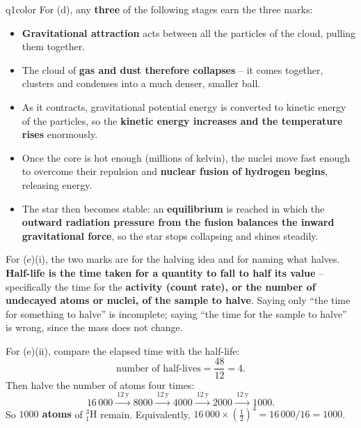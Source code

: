 \documentclass[11pt,a4paper]{article}
\begin{document}
\begin{ansbox}{q1color}
For (d), any \textbf{three} of the following stages earn the three marks:

\begin{itemize}[nosep,leftmargin=*]
\item \textbf{Gravitational attraction} acts between all the particles of the cloud, pulling them together.
\item The cloud of \textbf{gas and dust therefore collapses} -- it comes together, clusters and condenses into a much denser, smaller ball.
\item As it contracts, gravitational potential energy is converted to kinetic energy of the particles, so the \textbf{kinetic energy increases and the temperature rises} enormously.
\item Once the core is hot enough (millions of kelvin), the nuclei move fast enough to overcome their repulsion and \textbf{nuclear fusion of hydrogen begins}, releasing energy.
\item The star then becomes stable: an \textbf{equilibrium} is reached in which the \textbf{outward radiation pressure from the fusion balances the inward gravitational force}, so the star stops collapsing and shines steadily.
\end{itemize}

For (e)(i), the two marks are for the halving idea and for naming what halves. \textbf{Half-life is the time taken for a quantity to fall to half its value} -- specifically the time for the \textbf{activity (count rate), or the number of undecayed atoms or nuclei, of the sample to halve}. Saying only ``the time for something to halve'' is incomplete; saying ``the time for the sample to halve'' is wrong, since the mass does not change.

For (e)(ii), compare the elapsed time with the half-life:
\[ \text{number of half-lives} = \frac{48}{12} = 4. \]
Then halve the number of atoms four times:
\[ 16\,000 \xrightarrow{\ 12\ \mathrm{y}\ } 8000 \xrightarrow{\ 12\ \mathrm{y}\ } 4000 \xrightarrow{\ 12\ \mathrm{y}\ } 2000 \xrightarrow{\ 12\ \mathrm{y}\ } 1000. \]
So \textbf{$1000$ atoms} of $^{3}_{1}\mathrm{H}$ remain. Equivalently, $16\,000 \times \left(\tfrac{1}{2}\right)^{4} = 16\,000/16 = 1000$.
\end{ansbox}
\end{document}
